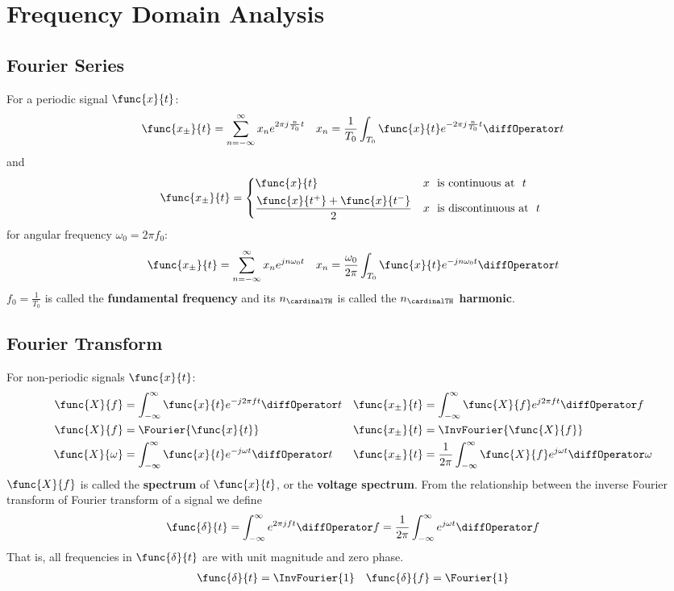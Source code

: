 \chapter{Frequency Domain Analysis}
\section{Fourier Series}
For a periodic signal \(\func{x}{t}\):
\begin{align*}
    \func{x_{\pm}}{t} = \sum_{n = -\infty}^{\infty} x_n e^{2\pi j \frac{n}{T_0} t} & & x_n = \dfrac{1}{T_0} \int_{T_0} \func{x}{t} e^{-2 \pi j \frac{n}{T_0} t} \diffOperator t
\end{align*}
and 
\begin{equation*}
    \func{x_{\pm}}{t} = \begin{cases*}
        \func{x}{t} & \(x\)  \text{ is continuous at } \(t\)\\
        \dfrac{\func{x}{t^+} + \func{x}{t^-}}{2} & \(x\) \text{ is discontinuous at } \(t\)
    \end{cases*}
\end{equation*}
for angular frequency \(\omega_0 = 2\pi f_0\):
\begin{align*}
    \func{x_{\pm}}{t} = \sum_{n = -\infty}^{\infty} x_n e^{ j n \omega_0 t} & & x_n = \dfrac{\omega_0}{2\pi} \int_{T_0} \func{x}{t} e^{- j n \omega_0 t} \diffOperator t
\end{align*}
\(f_0 = \frac{1}{T_0}\) is called the \textbf{fundamental frequency} and its \(n_{\cardinalTH}\) is called the \textbf{\(n_{\cardinalTH}\) harmonic}.
\section{Fourier Transform}
For non-periodic signals \(\func{x}{t}\):
\begin{align*}
    \func{X}{f} &= \int_{-\infty}^{\infty} \func{x}{t} e^{-j 2\pi f t} \diffOperator t &  \func{x_{\pm}}{t} &= \int_{-\infty}^{\infty} \func{X}{f} e^{j 2\pi f t}\diffOperator f\\
    \func{X}{f} &= \Fourier{\func{x}{t}}  & \func{x_{\pm}}{t} &= \InvFourier{\func{X}{f}}\\
    \func{X}{\omega} &= \int_{-\infty}^{\infty} \func{x}{t} e^{-j \omega t} \diffOperator t & \func{x_{\pm}}{t} &= \dfrac{1}{2\pi} \int_{-\infty}^{\infty} \func{X}{f} e^{j \omega t}\diffOperator \omega
\end{align*}
\(\func{X}{f}\) is called the \textbf{spectrum} of \(\func{x}{t}\), or the \textbf{voltage spectrum}. From the relationship between the inverse Fourier transform of Fourier transform of a signal we define
\begin{equation*}
    \func{\delta}{t} = \int_{-\infty}^{\infty} e^{2\pi j f t}\diffOperator f = \dfrac{1}{2\pi} \int_{-\infty}^{\infty} e^{j \omega t}\diffOperator f
\end{equation*}
That is, all frequencies in \(\func{\delta}{t}\) are with unit magnitude and zero phase.
\begin{align*}
    \func{\delta}{t} = \InvFourier{1} & & \func{\delta}{f} = \Fourier{1}
\end{align*}
